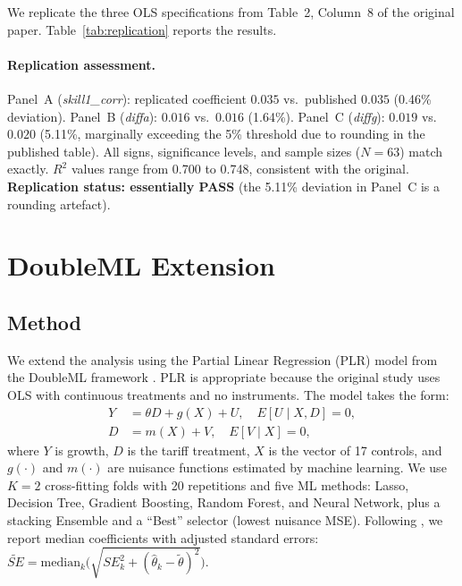 \documentclass[12pt]{article}
\begin{document}
We replicate the three OLS specifications from Table~2, Column~8 of the
original paper. Table~\ref{tab:replication} reports the results.



\paragraph{Replication assessment.}
Panel~A (\textit{skill1\_corr}): replicated coefficient $0.035$ vs.\
published $0.035$ (0.46\% deviation). Panel~B (\textit{diffa}): $0.016$
vs.\ $0.016$ (1.64\%). Panel~C (\textit{diffg}): $0.019$ vs.\ $0.020$
(5.11\%, marginally exceeding the 5\% threshold due to rounding in the
published table). All signs, significance levels, and sample sizes
($N = 63$) match exactly. $R^2$ values range from 0.700 to 0.748,
consistent with the original. \textbf{Replication status: essentially
PASS} (the 5.11\% deviation in Panel~C is a rounding artefact).

\section{DoubleML Extension}

\subsection{Method}

We extend the analysis using the Partial Linear Regression (PLR) model
from the DoubleML framework \citep{chernozhukov2018}. PLR is appropriate
because the original study uses OLS with continuous treatments and no
instruments. The model takes the form:
\begin{align}
  Y &= \theta D + g(X) + U, \quad E[U \mid X, D] = 0, \\
  D &= m(X) + V, \quad E[V \mid X] = 0,
\end{align}
where $Y$ is growth, $D$ is the tariff treatment, $X$ is the vector of
17 controls, and $g(\cdot)$ and $m(\cdot)$ are nuisance functions estimated
by machine learning. We use $K = 2$ cross-fitting folds with 20
repetitions and five ML methods: Lasso, Decision Tree, Gradient Boosting,
Random Forest, and Neural Network, plus a stacking Ensemble and a ``Best''
selector (lowest nuisance MSE). Following \citet{baiardi2024}, we report
median coefficients with adjusted standard errors:
$\widetilde{SE} = \text{median}_k\!\bigl(\sqrt{SE_k^2 + (\hat\theta_k -
\tilde\theta)^2}\bigr)$.
\end{document}
